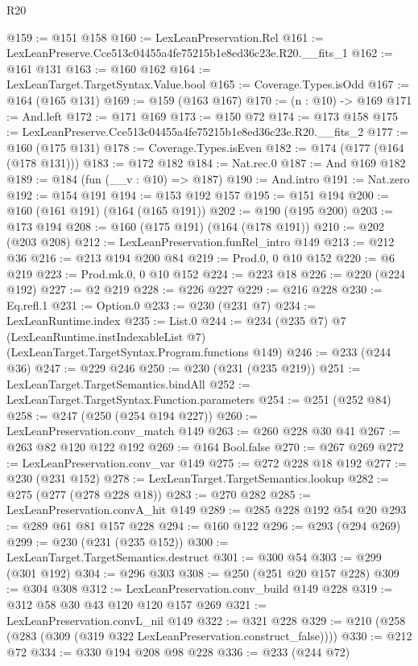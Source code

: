 \begin{lexlean}{R20}
\begin{coremodule}
@159 := @151 @158
@160 := LexLeanPreservation.Rel
@161 := LexLeanPreserve.Cce513c04455a4fe75215b1e8ed36c23e.R20.__fits_1
@162 := @161 @131
@163 := @160 @162
@164 := LexLeanTarget.TargetSyntax.Value.bool
@165 := Coverage.Types.isOdd
@167 := @164 (@165 @131)
@169 := @159 (@163 @167)
@170 := (n : @10) -> @169
@171 := And.left
@172 := @171 @169
@173 := @150 @72
@174 := @173 @158
@175 := LexLeanPreserve.Cce513c04455a4fe75215b1e8ed36c23e.R20.__fits_2
@177 := @160 (@175 @131)
@178 := Coverage.Types.isEven
@182 := @174 (@177 (@164 (@178 @131)))
@183 := @172 @182
@184 := Nat.rec.{0}
@187 := And @169 @182
@189 := @184 (fun (__v : @10) => @187)
@190 := And.intro
@191 := Nat.zero
@192 := @154 @191
@194 := @153 @192 @157
@195 := @151 @194
@200 := @160 (@161 @191) (@164 (@165 @191))
@202 := @190 (@195 @200)
@203 := @173 @194
@208 := @160 (@175 @191) (@164 (@178 @191))
@210 := @202 (@203 @208)
@212 := LexLeanPreservation.funRel_intro @149
@213 := @212 @36
@216 := @213 @194 @200 @84
@219 := Prod.{0, 0} @10 @152
@220 := @6 @219
@223 := Prod.mk.{0, 0} @10 @152
@224 := @223 @18
@226 := @220 (@224 @192)
@227 := @2 @219
@228 := @226 @227
@229 := @216 @228
@230 := Eq.refl.{1}
@231 := Option.{0}
@233 := @230 (@231 @7)
@234 := LexLeanRuntime.index
@235 := List.{0}
@244 := @234
    (@235 @7)
    @7
    (LexLeanRuntime.instIndexableList @7)
    (LexLeanTarget.TargetSyntax.Program.functions @149)
@246 := @233 (@244 @36)
@247 := @229 @246
@250 := @230 (@231 (@235 @219))
@251 := LexLeanTarget.TargetSemantics.bindAll
@252 := LexLeanTarget.TargetSyntax.Function.parameters
@254 := @251 (@252 @84)
@258 := @247 (@250 (@254 @194 @227))
@260 := LexLeanPreservation.conv_match @149
@263 := @260 @228 @30 @41
@267 := @263 @82 @120 @122 @192
@269 := @164 Bool.false
@270 := @267 @269
@272 := LexLeanPreservation.conv_var @149
@275 := @272 @228 @18 @192
@277 := @230 (@231 @152)
@278 := LexLeanTarget.TargetSemantics.lookup
@282 := @275 (@277 (@278 @228 @18))
@283 := @270 @282
@285 := LexLeanPreservation.convA_hit @149
@289 := @285 @228 @192 @54 @20
@293 := @289 @61 @81 @157 @228
@294 := @160 @122
@296 := @293 (@294 @269)
@299 := @230 (@231 (@235 @152))
@300 := LexLeanTarget.TargetSemantics.destruct
@301 := @300 @54
@303 := @299 (@301 @192)
@304 := @296 @303
@308 := @250 (@251 @20 @157 @228)
@309 := @304 @308
@312 := LexLeanPreservation.conv_build @149 @228
@319 := @312 @58 @30 @43 @120 @120 @157 @269
@321 := LexLeanPreservation.convL_nil @149
@322 := @321 @228
@329 := @210 (@258 (@283 (@309 (@319 @322 LexLeanPreservation.construct_false))))
@330 := @212 @72
@334 := @330 @194 @208 @98 @228
@336 := @233 (@244 @72)

\end{coremodule}
\end{lexlean}
